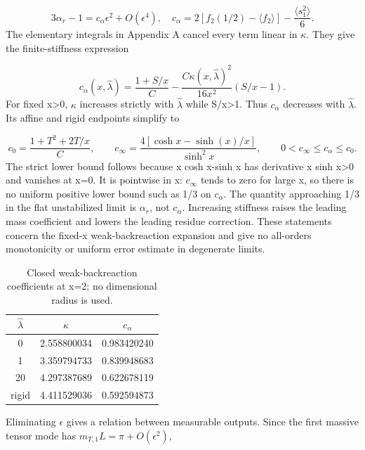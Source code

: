 \documentclass[11pt,a4paper]{article}
\begin{document}
\begin{equation}
3\alpha_r-1=c_\alpha\epsilon^2+O(\epsilon^4),\quad c_\alpha=2[f_2(1/2)-\langle f_2\rangle]-\frac{\langle s_1^2\rangle}{6}.\tag{21}
\end{equation}
The elementary integrals in Appendix A cancel every term linear in \ensuremath{\kappa}. They give the finite-stiffness expression

\begin{equation}
c_\alpha(x,\widehat\lambda)=\frac{1+S/x}{C}-\frac{C\kappa(x,\widehat\lambda)^2}{16x^2}(S/x-1).\tag{22}
\end{equation}
For fixed x>0, \ensuremath{\kappa} increases strictly with \ensuremath{\hat{\lambda}} while S/x>1. Thus \ensuremath{c_\alpha} decreases with \ensuremath{\hat{\lambda}}. Its affine and rigid endpoints simplify to

\begin{equation}
c_0=\frac{1+T^2+2T/x}{C},\qquad c_\infty=\frac{4[\cosh x-\sinh(x)/x]}{\sinh^2x},\qquad 0<c_\infty\le c_\alpha\le c_0.\tag{23}
\end{equation}
The strict lower bound follows because x cosh x-sinh x has derivative x sinh x>0 and vanishes at x=0. It is pointwise in x: \ensuremath{c_\infty} tends to zero for large x, so there is no uniform positive lower bound such as 1/3 on \ensuremath{c_\alpha}. The quantity approaching 1/3 in the flat unstabilized limit is \ensuremath{\alpha_r}, not \ensuremath{c_\alpha}. Increasing stiffness raises the leading mass coefficient and lowers the leading residue correction. These statements concern the fixed-x weak-backreaction expansion and give no all-orders monotonicity or uniform error estimate in degenerate limits.

\begin{table}[htbp]
\centering\small
\begin{tabular}{ccc}
\toprule
\ensuremath{\hat{\lambda}} & \ensuremath{\kappa} & \ensuremath{c_\alpha}\\
\midrule
0 & 2.558800034 & 0.983420240\\
1 & 3.359794733 & 0.839948683\\
20 & 4.297387689 & 0.622678119\\
rigid & 4.411529036 & 0.592594873\\
\bottomrule
\end{tabular}
\caption{Closed weak-backreaction coefficients at x=2; no dimensional radius is used.}
\end{table}
Eliminating \ensuremath{\epsilon} gives a relation between measurable outputs. Since the first massive tensor mode has \ensuremath{m_{T,1}L=\pi+O(\epsilon^2)},
\end{document}
